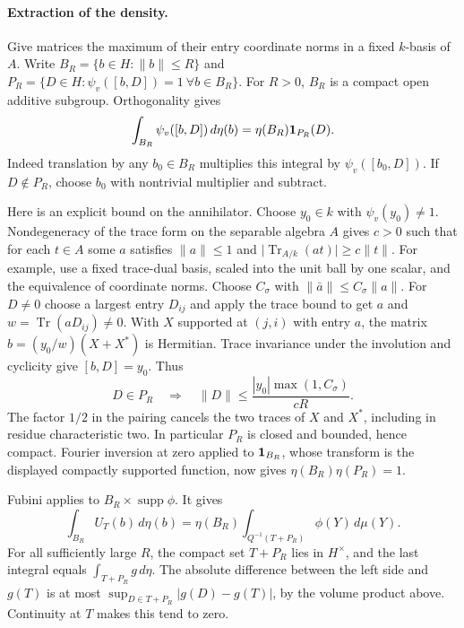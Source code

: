 \paragraph{Extraction of the density.}
Give matrices the maximum of their entry coordinate norms in a fixed
\(k\)-basis of \(A\). Write \(B_R=\{b\in H:\|b\|\leq R\}\) and
\(P_R=\{D\in H:\psi_v([b,D])=1\ \forall b\in B_R\}\). For \(R>0\),
\(B_R\) is a compact open additive subgroup. Orthogonality gives
\[
  \int_{B_R}\psi_v([b,D])\,d\eta(b)=\eta(B_R){\bf1}_{P_R}(D).
\]
Indeed translation by any \(b_0\in B_R\) multiplies this integral by
\(\psi_v([b_0,D])\). If \(D\notin P_R\), choose \(b_0\) with
nontrivial multiplier and subtract.

Here is an explicit bound on the annihilator. Choose \(y_0\in k\)
with \(\psi_v(y_0)\ne1\). Nondegeneracy of the trace form on the
separable algebra \(A\) gives \(c>0\) such that for each \(t\in A\)
some \(a\) satisfies \(\|a\|\leq1\) and
\(\lvert\operatorname{Tr}_{A/k}(at)\rvert\geq c\|t\|\).
For example, use a fixed trace-dual basis, scaled into the unit
ball by one scalar, and the equivalence of coordinate norms.
Choose \(C_\sigma\) with \(\|\bar a\|\leq C_\sigma\|a\|\).
For \(D\ne0\) choose a largest entry \(D_{ij}\) and apply the trace
bound to get \(a\) and \(w=\operatorname{Tr}(aD_{ij})\ne0\).
With \(X\) supported at \((j,i)\) with entry \(a\), the matrix
\(b=(y_0/w)(X+X^*)\) is Hermitian. Trace invariance under the
involution and cyclicity give \([b,D]=y_0\). Thus
\[
 D\in P_R\quad\Longrightarrow\quad
 \|D\|\leq\frac{|y_0|\max(1,C_\sigma)}{cR}.
\]
The factor \(1/2\) in the pairing cancels the two traces of \(X\)
and \(X^*\), including in residue characteristic two.
In particular \(P_R\) is closed and bounded, hence compact.
Fourier inversion at zero applied to \({\bf1}_{B_R}\), whose transform
is the displayed compactly supported function, now gives
\(\eta(B_R)\eta(P_R)=1\).

Fubini applies to \(B_R\times\operatorname{supp}\phi\). It gives
\[
 \int_{B_R}U_T(b)\,d\eta(b)=\eta(B_R)
                  \int_{Q^{-1}(T+P_R)}\phi(Y)\,d\mu(Y).
\]
For all sufficiently large \(R\), the compact set \(T+P_R\) lies in
\(H^\times\), and the last integral equals \(\int_{T+P_R}g\,d\eta\).
The absolute difference between the left side and \(g(T)\) is at
most \(\sup_{D\in T+P_R}|g(D)-g(T)|\), by the volume product above.
Continuity at \(T\) makes this tend to zero.

